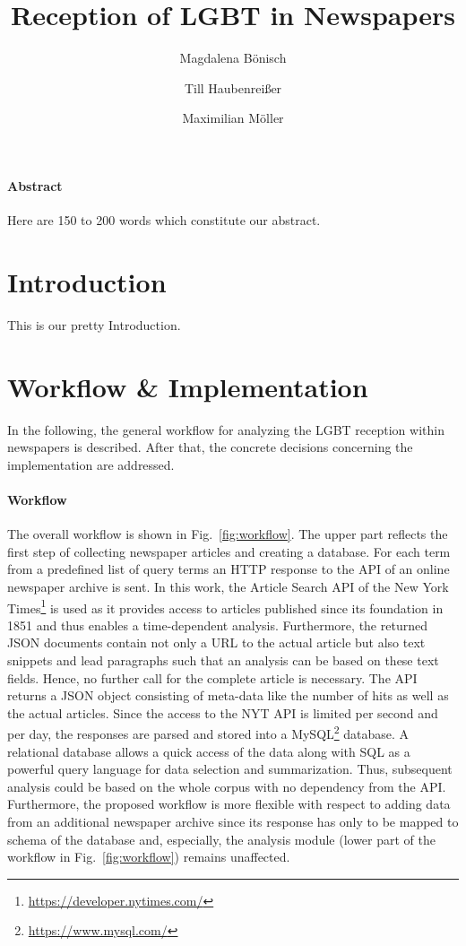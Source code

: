 \documentclass[10pt,a4paper,twocolumn]{scrartcl}
\title{Reception of LGBT in Newspapers}
\author{Magdalena Bönisch \and Till Haubenreißer \and Maximilian Möller}
\begin{document}
\onehalfspacing

\maketitle

{\footnotesize
\paragraph*{Abstract} Here are 150 to 200 words which constitute our abstract.
}


\section{Introduction}
This is our pretty Introduction.

\section{Workflow \& Implementation}
In the following, the general workflow for analyzing the LGBT reception within newspapers is described. After that, the concrete decisions concerning the implementation are addressed.

\paragraph*{Workflow} The overall workflow is shown in Fig.~\ref{fig:workflow}. The upper part reflects the first step of collecting newspaper articles and creating a database. For each term from a predefined list of query terms an HTTP response to the API of an online newspaper archive is sent. In this work, the Article Search API of the New York Times\footnote{\url{https://developer.nytimes.com/}} is used as it provides access to articles published since its foundation in 1851 and thus enables a time-dependent analysis. Furthermore, the returned JSON documents contain not only a URL to the actual article but also text snippets and lead paragraphs such that an analysis can be based on these text fields. Hence, no further call for the complete article is necessary. The API returns a JSON object consisting of meta-data like the number of hits as well as the actual articles. Since the access to the NYT API is limited per second and per day, the responses are parsed and stored into a MySQL\footnote{\url{https://www.mysql.com/}} database. A relational database allows a quick access of the data along with SQL as a powerful query language for data selection and summarization. Thus, subsequent analysis could be based on the whole corpus with no dependency from the API. Furthermore, the proposed workflow is more flexible with respect to adding data from an additional newspaper archive since its response has only to be mapped to schema of the database and, especially, the analysis module (lower part of the workflow in Fig.~\ref{fig:workflow}) remains unaffected.
\end{document}
